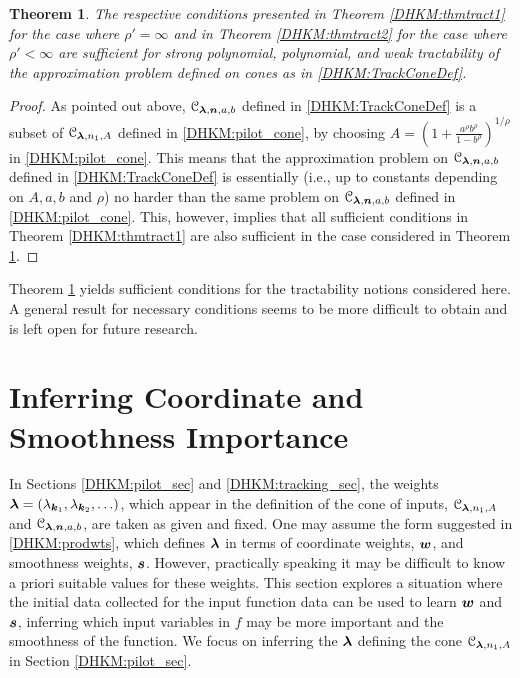 \documentclass[USenglish]{article}
\theoremstyle{dgthm}
\newtheorem{theorem}{Theorem}
\theoremstyle{dgthm}
\theoremstyle{dgthm}
\theoremstyle{dgthm}
\theoremstyle{dgdef}
\theoremstyle{definition}
\begin{document}
\begin{theorem} \label{DHKM:thmtract3}
The respective conditions presented in Theorem \ref{DHKM:thmtract1} for the case where $\rho'=\infty$ and 
in Theorem \ref{DHKM:thmtract2} for the case where $\rho'<\infty$ are sufficient for strong polynomial, polynomial, and weak tractability of the approximation problem defined on cones as in \eqref{DHKM:TrackConeDef}.
\end{theorem}
\begin{proof}
As pointed out above, ${\mathcal{C}}_{\boldsymbol{\lambda},{\boldsymbol{n}},a,b}$ defined in \eqref{DHKM:TrackConeDef} is a subset of  ${\mathcal{C}}_{\boldsymbol{\lambda},n_1,A}$ defined in \eqref{DHKM:pilot_cone}, by choosing $A=\left(1 + \frac{a^\rho b^\rho}{1 - b^\rho} \right)^{1/\rho}$ in \eqref{DHKM:pilot_cone}. This means that the approximation problem on  ${\mathcal{C}}_{\boldsymbol{\lambda},{\boldsymbol{n}},a,b}$ defined in \eqref{DHKM:TrackConeDef} is essentially (i.e., up to constants depending on $A,a,b$ and $\rho$) no harder than the same problem on ${\mathcal{C}}_{\boldsymbol{\lambda},{\boldsymbol{n}},a,b}$ defined in \eqref{DHKM:pilot_cone}. This, however, implies that all sufficient conditions in Theorem \ref{DHKM:thmtract1} are also sufficient in the case considered in Theorem \ref{DHKM:thmtract3}.
\end{proof}

Theorem \ref{DHKM:thmtract3} yields sufficient conditions for the tractability notions considered 
here. A general result for necessary conditions seems to be more difficult to obtain and is left open for future research.



\section{Inferring Coordinate and Smoothness Importance} \label{DHKM:smoothimportance_sec}

In Sections \ref{DHKM:pilot_sec} and \ref{DHKM:tracking_sec}, the weights ${\boldsymbol{\lambda}} = (\lambda_{{\boldsymbol{k}}_1}, \lambda_{{\boldsymbol{k}}_2}, \ldots )$, which appear in the definition of the cone of inputs, ${\mathcal{C}}_{{\boldsymbol{\lambda}},n_1,A}$ and ${\mathcal{C}}_{{\boldsymbol{\lambda}},{\boldsymbol{n}},a,b}$, are taken as given and fixed.  One may assume the form suggested in \eqref{DHKM:prodwts}, which defines ${\boldsymbol{\lambda}}$ in terms of coordinate weights, ${\boldsymbol{w}}$, and smoothness weights, ${\boldsymbol{s}}$.  However, practically speaking it may be difficult to know a priori suitable values for these weights.
This section explores a situation where the initial data collected for the input function data can be used to learn ${\boldsymbol{w}}$ and ${\boldsymbol{s}}$, inferring which input variables in $f$ may be more important and the smoothness of the function.  We focus on inferring the ${\boldsymbol{\lambda}}$ defining the cone ${\mathcal{C}}_{{\boldsymbol{\lambda}},n_1,A}$ in Section \ref{DHKM:pilot_sec}.  
\end{document}
